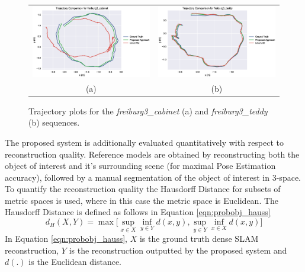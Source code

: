 \begin{figure}[ht]
  \label{fig:probobj_traj}
  \centering
  \begin{tabular}{cc}
  \includegraphics[width=.5\linewidth]{figures/object_recon/plots/traj/cab_traj.eps} & 
  \includegraphics[width=.5\linewidth]{figures/object_recon/plots/traj/ted_traj.eps} \\
  (a) & (b)
  \end{tabular}
  \caption[Probabilistic Object Reconstruction Trajectory Plots]
  {Trajectory plots for the \textit{freiburg3\_cabinet} (a) 
  and \textit{\textsf{freiburg3\_teddy}} (b) sequences.}
\end{figure}

The proposed system is additionally evaluated quantitatively with respect to reconstruction 
quality. Reference models are obtained by reconstructing both the object of interest and it's 
surrounding scene (for maximal Pose Estimation accuracy), followed by a manual segmentation of 
the object of interest in 3-space. To quantify the reconstruction quality the Hausdorff 
Distance \cite{Hausdorff} for subsets of metric spaces is used, where in this case the metric 
space is Euclidean. The Hausdorff Distance is defined as follows in Equation \ref{eqn:probobj_hauss}
\begin{equation}
  \label{eqn:probobj_hauss}
  d_{H}(X, Y) = \max \Bigg[
  \sup_{x \in X} \inf_{y \in Y} d(x, y), \sup_{y \in Y} \inf_{x \in X} d(x, y) 
  \Bigg]
\end{equation}
In Equation \ref{eqn:probobj_hauss}, $X$ is the ground truth dense SLAM reconstruction, 
$Y$ is the reconstruction outputted by the proposed system and $d(.)$ is the Euclidean 
distance.


